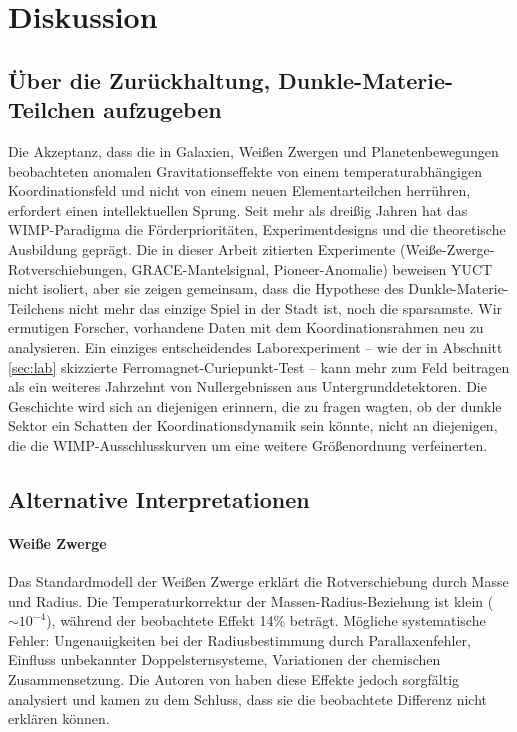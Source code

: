 \documentclass[12pt]{article}
\theoremstyle{remark}
\begin{document}
	\section{Diskussion}
	\label{sec:discussion}
	
	\subsection{Über die Zurückhaltung, Dunkle-Materie-Teilchen aufzugeben}
	\label{subsec:on-reluctance}
	
	Die Akzeptanz, dass die in Galaxien, Weißen Zwergen und Planetenbewegungen beobachteten anomalen Gravitationseffekte von einem temperaturabhängigen Koordinationsfeld und nicht von einem neuen Elementarteilchen herrühren, erfordert einen intellektuellen Sprung. Seit mehr als dreißig Jahren hat das WIMP-Paradigma die Förderprioritäten, Experimentdesigns und die theoretische Ausbildung geprägt. Die in dieser Arbeit zitierten Experimente (Weiße-Zwerge-Rotverschiebungen, GRACE-Mantelsignal, Pioneer-Anomalie) beweisen YUCT nicht isoliert, aber sie zeigen gemeinsam, dass die Hypothese des Dunkle-Materie-Teilchens nicht mehr das einzige Spiel in der Stadt ist, noch die sparsamste. Wir ermutigen Forscher, vorhandene Daten mit dem Koordinationsrahmen neu zu analysieren. Ein einziges entscheidendes Laborexperiment – wie der in Abschnitt \ref{sec:lab} skizzierte Ferromagnet-Curiepunkt-Test – kann mehr zum Feld beitragen als ein weiteres Jahrzehnt von Nullergebnissen aus Untergrunddetektoren. Die Geschichte wird sich an diejenigen erinnern, die zu fragen wagten, ob der dunkle Sektor ein Schatten der Koordinationsdynamik sein könnte, nicht an diejenigen, die die WIMP-Ausschlusskurven um eine weitere Größenordnung verfeinerten.
	
	\subsection{Alternative Interpretationen}
	\label{subsec:discussion-alternatives}
	
	\paragraph{Weiße Zwerge}
	Das Standardmodell der Weißen Zwerge erklärt die Rotverschiebung durch Masse und Radius. Die Temperaturkorrektur der Massen-Radius-Beziehung ist klein ($\sim 10^{-4}$), während der beobachtete Effekt 14\% beträgt. Mögliche systematische Fehler: Ungenauigkeiten bei der Radiusbestimmung durch Parallaxenfehler, Einfluss unbekannter Doppelsternsysteme, Variationen der chemischen Zusammensetzung. Die Autoren von \cite{Crumpler2024} haben diese Effekte jedoch sorgfältig analysiert und kamen zu dem Schluss, dass sie die beobachtete Differenz nicht erklären können.
	
\end{document}
